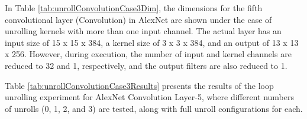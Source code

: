 In Table \ref{tab:unrollConvolutionCase3Dim}, the dimensions for the fifth convolutional layer (Convolution) in AlexNet are shown under the case of unrolling kernels with more than one input channel. The actual layer has an input size of 15 x 15 x 384, a kernel size of 3 x 3 x 384, and an output of 13 x 13 x 256. However, during execution, the number of input and kernel channels are reduced to 32 and 1, respectively, and the output filters are also reduced to 1.
\\
\begin{table}[H]
\centering
\caption{Loop unrolling results}
\label{tab:unrollConvolutionCase3Results}
\end{table}

Table \ref{tab:unrollConvolutionCase3Results} presents the results of the loop unrolling experiment for AlexNet Convolution Layer-5, where different numbers of unrolls (0, 1, 2, and 3) are tested, along with full unroll configurations for each.

